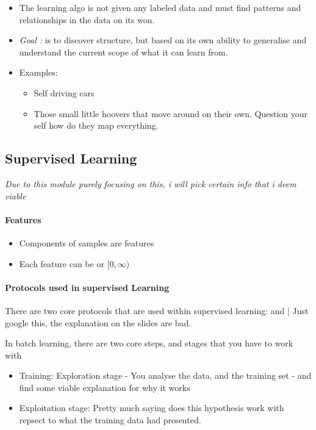 \documentclass{article}
\theoremstyle{mytheoremstyle}
\theoremstyle{mytheoremstyle}
\theoremstyle{myproblemstyle}
\begin{document}
\begin{itemize}
\begin{itemize}
		      \item The learning algo is not given any labeled data and must find patterns and relationships in the data on its won.
		      \item \textit{Goal : } is to discover structure, but based on its own ability to generalise and understand the current scope of what it can learn from.
		      \item Examples:
		            \begin{itemize}
			            \item Self driving cars
			            \item Those small little hoovers that move around on their own. Question your self how do they map everything.
		            \end{itemize}
	      \end{itemize}

\end{itemize}

\subsection{Supervised Learning}
\textit{Due to this module purely focusing on this, i will pick certain info that i deem viable}\\

\paragraph{Features}
\begin{itemize}
	\item Components of samples are features
	\item Each feature can be  or  $ [0, \infty )$
\end{itemize}

\paragraph{Protocols used in supervised Learning}
There are two core protocols that are used within supervised learning:
 and  | Just google this, the explanation on the slides are bad.

In batch learning, there are two core steps, and stages that you have to work with
\begin{itemize}
	\item Training: Exploration stage - You analyse the data, and the training set - and find some viable explanation for why it works
	\item Exploitation stage: Pretty much saying does this hypothesis work with repsect to what the training data had presented.
\end{itemize}
\end{document}

